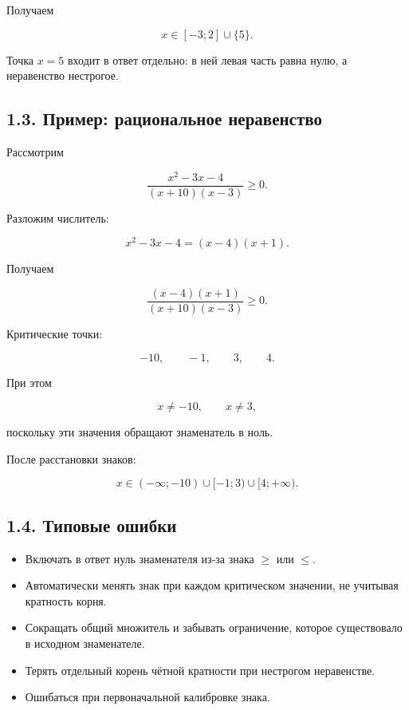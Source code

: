 \documentclass[a4paper,12pt]{article}
\newcommand{\checkitem}{\item[$\square$]}
\begin{document}
Получаем

\[
\boxed{x\in[-3;2]\cup\{5\}}.
\]

Точка \(x=5\) входит в ответ отдельно:
в ней левая часть равна нулю, а неравенство нестрогое.

\subsection*{1.3. Пример: рациональное неравенство}

Рассмотрим

\[
\frac{x^2-3x-4}{(x+10)(x-3)}\ge0.
\]

Разложим числитель:

\[
x^2-3x-4=(x-4)(x+1).
\]

Получаем

\[
\frac{(x-4)(x+1)}
     {(x+10)(x-3)}
\ge0.
\]

Критические точки:

\[
-10,\qquad -1,\qquad 3,\qquad 4.
\]

При этом

\[
x\ne-10,\qquad x\ne3,
\]

поскольку эти значения обращают знаменатель в ноль.

После расстановки знаков:

\[
\boxed{
x\in
(-\infty;-10)
\cup[-1;3)
\cup[4;+\infty)
}.
\]

\subsection*{1.4. Типовые ошибки}

\begin{itemize}

\checkitem
Включать в ответ нуль знаменателя из-за знака
\(\ge\) или \(\le\).

\checkitem
Автоматически менять знак при каждом критическом значении,
не учитывая кратность корня.

\checkitem
Сокращать общий множитель и забывать ограничение,
которое существовало в исходном знаменателе.

\checkitem
Терять отдельный корень чётной кратности
при нестрогом неравенстве.

\checkitem
Ошибаться при первоначальной калибровке знака.

\end{itemize}

\end{document}
